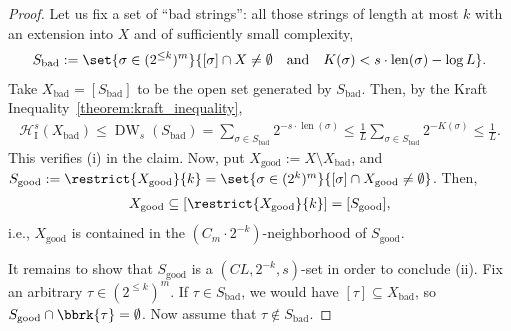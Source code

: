 \begin{proof}    
    Let us fix a set of ``bad strings'': all those strings of length at most $k$ with an extension into $X$ and of sufficiently small complexity,
    \begin{align*}
        S_{\operatorname{bad}} := \set{\sigma \in (2^{\leq k})^m}{[\sigma] \cap X \neq \emptyset \quad \text{and} \quad K(\sigma) < s \cdot \operatorname{len}(\sigma) - \log L}.
    \end{align*}
    Take $X_{\operatorname{bad}} = [S_{\operatorname{bad}}]$ to be the open set generated by $S_{\operatorname{bad}}$.
    Then, by the Kraft Inequality~\ref{theorem:kraft_inequality},
    \begin{align*}
        \mathcal{H}^s_{\operatorname{I}}(X_{\operatorname{bad}}) \leq \operatorname{DW}_s(S_{\operatorname{bad}}) = \sum_{\sigma \in S_{\operatorname{bad}}} 2^{- s \cdot \operatorname{len}(\sigma)} \leq \frac{1}{L} \sum_{\sigma \in S_{\operatorname{bad}}} 2^{-K(\sigma)} \leq \frac{1}{L}.
    \end{align*}
    This verifies (i) in the claim. Now, put $X_{\operatorname{good}} := X \setminus X_{\operatorname{bad}}$, and $S_{\operatorname{good}} := \restrict{X_{\operatorname{good}}}{k} = \set{\sigma \in (2^{k})^m}{[\sigma] \cap X_{\operatorname{good}} \neq \emptyset}$. Then,
    \begin{align*}
        X_{\operatorname{good}} \subseteq [\restrict{X_{\operatorname{good}}}{k}] = [S_{\operatorname{good}}],
    \end{align*}
    i.e., $X_{\operatorname{good}}$ is contained in the $(C_m \cdot 2^{-k})$-neighborhood of $S_{\operatorname{good}}$.

    It remains to show that $S_{\operatorname{good}}$ is a $(CL, 2^{-k}, s)$-set in order to conclude (ii). Fix an arbitrary $\tau \in (2^{\leq k})^m$. If $\tau \in S_{\operatorname{bad}}$, we would have $[\tau] \subseteq X_{\operatorname{bad}}$, so $S_{\operatorname{good}} \cap \bbrk{\tau} = \emptyset$. Now assume that $\tau \not\in S_{\operatorname{bad}}$. 


\end{proof}
